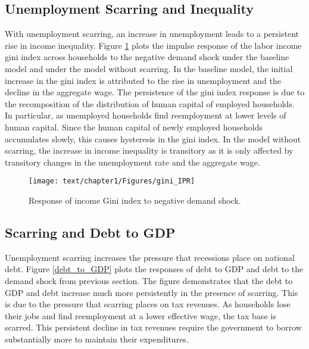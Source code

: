 \subsection{Unemployment Scarring and Inequality}

With unemployment scarring, an increase in unemployment leads to a persistent rise in income inequality. Figure \ref{Gini_IPR} plots the impulse response of the labor income gini index across households to the negative demand shock under the baseline model and under the model without scarring. In the baseline model, the initial increase in the gini index is attributed to the rise in unemployment and the decline in the aggregate wage. The persistence of the gini index response is due to the recomposition of the distribution of human capital of employed households. In particular, as unemployed households find reemployment at lower levels of human capital. Since the human capital of newly employed households accumulates slowly, this causes hysteresis in the gini index. In the model without scarring, the increase in income inequality is transitory as it is only affected by transitory changes in the unemployment rate and the aggregate wage.

\begin{figure}[!h]
   \begin{center}
   \begin{minipage}{0.7\textwidth}
        \centering
        \texttt{[image: text/chapter1/Figures/gini\_IPR]} %
    \end{minipage}
        \caption{Response of income Gini index to negative demand shock.}
    \label{Gini_IPR}
    \end{center}
  \end{figure}




\subsection{Scarring and Debt to GDP}

Unemployment scarring increases the pressure that recessions place on national debt. Figure \ref{debt_to_GDP} plots the responses of debt to GDP and debt to the demand shock from previous section. The figure demonstrates that the debt to GDP and debt increase much more persistently in the presence of scarring. This is due to the pressure that scarring places on tax revenues. As households lose their jobs and find reemployment at a lower effective wage, the tax base is scarred. This persistent decline in tax revenues require the government to borrow substantially more to maintain their expenditures.


